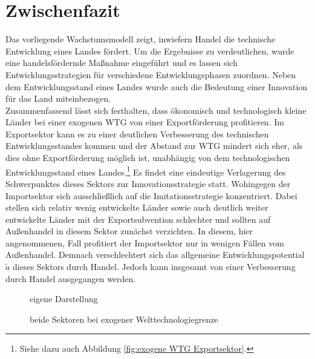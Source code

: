 \section{Zwischenfazit}
Das vorliegende Wachstumsmodell zeigt, inwiefern  Handel die technische Entwicklung eines Landes fördert. Um die Ergebnisse zu verdeutlichen, wurde eine handelsfördernde Maßnahme eingeführt und es lassen sich Entwicklungsstrategien für verschiedene Entwicklungsphasen zuordnen. Neben dem Entwicklungsstand eines Landes wurde auch die Bedeutung einer Innovation für das Land miteinbezogen.\\
%
Zusammenfassend lässt sich festhalten, dass ökonomisch und technologisch kleine Länder bei einer exogenen WTG von einer Exportförderung profitieren. Im Exportsektor kann es zu einer deutlichen Verbesserung des technischen Entwicklungsstandes kommen und der Abstand zur WTG mindert sich eher, als dies ohne Exportförderung möglich ist, unabhängig von dem technologischen Entwicklungsstand eines Landes.\footnote{Siehe dazu auch Abbildung \ref{fig:exogene WTG Exportsektor}.} Es findet eine eindeutige Verlagerung des Schwerpunktes dieses Sektors zur Innovationsstrategie statt. Wohingegen der Importsektor sich ausschließlich auf die Imitationsstrategie konzentriert. Dabei stellen sich relativ wenig entwickelte Länder sowie auch deutlich weiter entwickelte Länder mit der Exportsubvention schlechter und sollten auf Außenhandel in diesem Sektor zunächst verzichten. In diesem, hier angenommenen, Fall profitiert der Importsektor nur in wenigen Fällen vom Außenhandel. Demnach verschlechtert sich das allgemeine Entwicklungspotential $\tilde{a}$ dieses Sektors durch Handel. Jedoch kann insgesamt von einer Verbesserung durch Handel ausgegangen werden.\\
%
	\begin{figure}[h!] 
		\hfill{}  eigene Darstellung
		\caption{beide Sektoren bei exogener Welttechnologiegrenze}
		\label{fig:beide Sektor exogene WTG}
	\end{figure}
